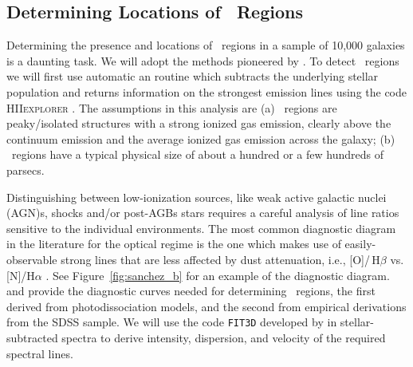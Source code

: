 \documentclass[11pt, a4paper, onecolumn]{article}
\begin{document}
\begin{multicols}{2}
\subsection{Determining Locations of \hii\ Regions }

    Determining the presence and locations of \hii\ regions in a sample of
    10,000 galaxies is a daunting task. We will adopt the methods pioneered by
    \citet{sanchez14}. To detect \hii\ regions we will first use automatic an
    routine which subtracts the underlying stellar population and returns
    information on the strongest emission lines using the code
    \textsc{HIIexplorer} \citep{sanchez12b}. The assumptions in this analysis
    are (a) \hii\ regions are peaky/isolated structures with a strong ionized
    gas emission, clearly above the continuum emission and the average ionized
    gas emission across the galaxy; (b) \hii\ regions have a typical physical
    size of about a hundred or a few hundreds of parsecs.

    Distinguishing between low-ionization sources, like weak active galactic
    nuclei (AGN)s, shocks and/or post-AGBs stars requires a careful analysis of
    line ratios sensitive to the individual environments. The most common
    diagnostic diagram in the literature for the optical regime is the one
    which makes use of easily-observable strong lines that are less affected by
    dust attenuation, i.e., [O\iii]/\,H$\beta$ vs. [N\ii]/H$\alpha$
    \citep{baldwin81}. See Figure~\ref{fig:sanchez_b} for an example of the
    diagnostic diagram. \citet{kewley01} and \citep{kauffmann03} provide the
    diagnostic curves needed for determining \hii\ regions, the first derived
    from photodissociation models, and the second from empirical derivations
    from the SDSS sample. We will use the code \texttt{FIT3D} developed by
    \citet{sanchez12} in stellar-subtracted spectra to derive intensity,
    dispersion, and velocity of the required spectral lines.
    
    \begin{figure}[!ht]

        \centering


\end{figure}
\end{multicols}
\end{document}
